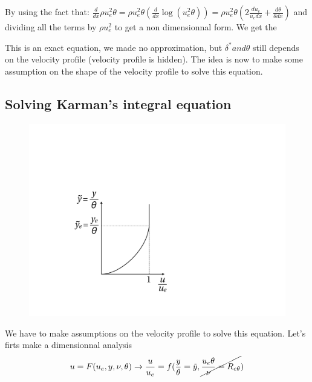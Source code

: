By using the fact that: $ \frac{d}{d x} \rho u_e^2 \theta = \rho u_e^2 \theta (\frac{d}{d x} \log(u_e^2 \theta))=\rho u_e^2 \theta(2\frac{d u_e}{u_e d x}+\frac{d \theta}{\theta d x})$ and dividing all the terms by $\rho u_e^2 $ to get a non dimensionnal form. We get the

\begin{center}
\end{center}

This is an exact equation, we made no approximation, but $\delta ^* and \theta$ still depends on the velocity profile (velocity profile is hidden). The idea is now to make some assumption on the shape of the velocity profile to solve this equation.

\subsection{Solving Karman's integral equation}

\begin{figure}
\vspace{-5mm}
\includegraphics[scale=0.25]{ch5/19}
\label{fig:5.18}
\end{figure}
We have to make assumptions on the velocity profile to solve this equation. Let's firts make a dimensionnal analysis
\begin{equation}
u=F(u_e,y,\nu,\theta) \rightarrow \frac{u}{u_e}=f(\frac{y}{\theta}=\tilde{y},\cancel{\frac{u_e \theta}{\nu}=R_{e \theta}})
\end{equation}

